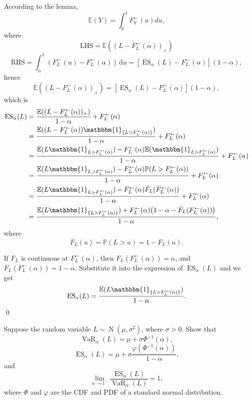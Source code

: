 \documentclass{MFM-hw} %
\newcommand{\VaR}{\operatorname{VaR}}
\newcommand{\ES}{\operatorname{ES}}
\newcommand{\normal}{\operatorname{N}}
\newcommand{\dd}{\,\mathrm{d}}
\newcommand{\E}{\mathbb{E}}
\renewcommand{\P}{\mathbb{P}}
\begin{document}
According to the lemma, 
\[
    \E(Y) = \int_0^1 F_Y^{\leftarrow}(u) du,
\]
where
\[
    \text{LHS} = \E((L - F_L^{\leftarrow}(\alpha))_{+})
\]
\[
    \text{RHS} = \int_{\alpha}^{1} (F_L^{\leftarrow}(u) - F_L^{\leftarrow}(\alpha)) \dd u  = [\ES_{\alpha}(L) - F_L^{\leftarrow}(\alpha)](1-\alpha),
\]
hence
\[
    \E((L - F_L^{\leftarrow}(\alpha))_{+}) = [\ES_{\alpha}(L) - F_L^{\leftarrow}(\alpha)](1-\alpha),
\]
which is
\begin{align*}
    \ES_{\alpha}(L) &= \frac{\E((L - F_L^{\leftarrow}(\alpha))_+)}{1-\alpha} +F_L^{\leftarrow}(\alpha) \\
    &=\frac{\E((L - F_L^{\leftarrow}(\alpha)){\mathbbm{1}_{\{L>F_L^{\leftarrow}(\alpha)\}}})}{1-\alpha} +F_L^{\leftarrow}(\alpha) \\
    &=\frac{\E(L\mathbbm{1}_{L>F_L^{\leftarrow}(\alpha)})-F_L^{\leftarrow}(\alpha)\E(\mathbbm{1}_{L>F_L^{\leftarrow}(\alpha)})}{1-\alpha} +F_L^{\leftarrow}(\alpha) \\
    &=\frac{\E(L\mathbbm{1}_{L>F_L^{\leftarrow}(\alpha)})-F_L^{\leftarrow}(\alpha)\P(L>F_L^{\leftarrow}(\alpha))}{1-\alpha} +F_L^{\leftarrow}(\alpha) \\
    &=\frac{\E(L\mathbbm{1}_{L>F_L^{\leftarrow}(\alpha)})-F_L^{\leftarrow}(\alpha)\bar{F}_L(F_L^{\leftarrow}(\alpha))}{1-\alpha} +F_L^{\leftarrow}(\alpha)\\
    &=\frac{\E(L\mathbbm{1}_{\{L>F_L^{\leftarrow}(\alpha)\}})+F_L^{\leftarrow}(\alpha)\bigl(1-\alpha-\bar{F}_L(F_L^{\leftarrow}(\alpha))\bigr)}{1-\alpha}, 
\end{align*}
where
\[
    \bar{F}_L(u) = \P(L>u) = 1 - F_L(u).
\]

If $F_L$ is continuous at $F_L^{\leftarrow}(\alpha)$, then $F_L(F_L^{\leftarrow}(\alpha)) = \alpha$, and $\bar{F}_L(F_L^{\leftarrow}(\alpha)) = 1-\alpha$. Substitute it into the expression of $\ES_\alpha(L)$ and we get
\[
    \ES_{\alpha}(L) = \frac{\E(L\mathbbm{1}_{\{L>F_L^{\leftarrow}(\alpha)\}})}{1-\alpha}.
\]\qed

\HWproblem
Suppose the random variable $L \sim \normal(\mu,\sigma^2)$, where $\sigma > 0$. Show that
\[
    \VaR_{\alpha}(L) = \mu + \sigma \Phi^{-1}(\alpha),
\]
\[
    \ES_{\alpha}(L) = \mu + \sigma\frac{\varphi(\Phi^{-1}(\alpha))}{1-\alpha},
\]
and
\[
    \lim\limits_{\alpha \rightarrow 1^{-}} \frac{\ES_{\alpha}(L)}{\VaR_{\alpha}(L)} = 1,
\]
where $\Phi$ and $\varphi$ are the CDF and PDF of a standard normal distribution.\\
\end{document}
